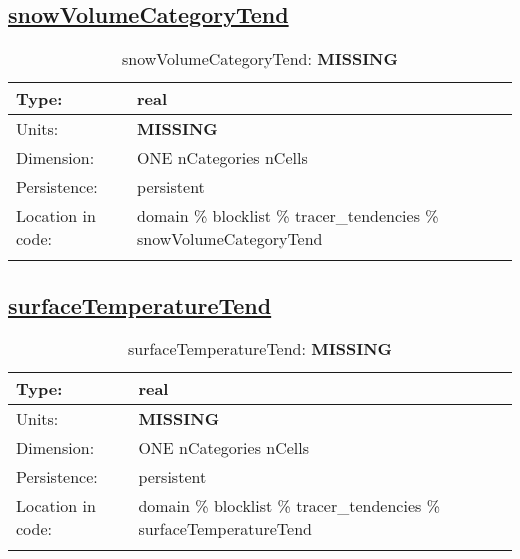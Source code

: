 \subsection[snowVolumeCategoryTend]{\hyperref[sec:var_tab_tracer_tendencies]{snowVolumeCategoryTend}}
\label{subsec:var_sec_tracer_tendencies_snowVolumeCategoryTend}
\begin{center}
\begin{longtable}{| p{2.0in} | p{4.0in} |}
        \hline 
        Type: & real \\
        \hline 
        Units: & {\bf \color{red} MISSING} \\
        \hline 
        Dimension: & ONE nCategories nCells \\
        \hline 
        Persistence: & persistent \\
        \hline 
         Location in code: & domain \% blocklist \% tracer\_tendencies \% snowVolumeCategoryTend \\
         \hline 
    \caption{snowVolumeCategoryTend: {\bf \color{red} MISSING}}
\end{longtable}
\end{center}
\subsection[surfaceTemperatureTend]{\hyperref[sec:var_tab_tracer_tendencies]{surfaceTemperatureTend}}
\label{subsec:var_sec_tracer_tendencies_surfaceTemperatureTend}
\begin{center}
\begin{longtable}{| p{2.0in} | p{4.0in} |}
        \hline 
        Type: & real \\
        \hline 
        Units: & {\bf \color{red} MISSING} \\
        \hline 
        Dimension: & ONE nCategories nCells \\
        \hline 
        Persistence: & persistent \\
        \hline 
         Location in code: & domain \% blocklist \% tracer\_tendencies \% surfaceTemperatureTend \\
         \hline 
    \caption{surfaceTemperatureTend: {\bf \color{red} MISSING}}
\end{longtable}
\end{center}
